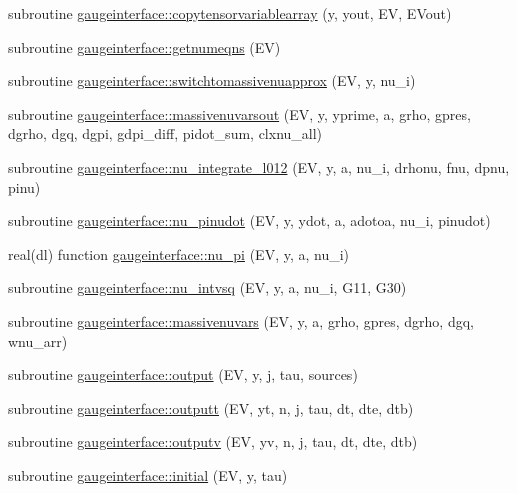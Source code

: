 \begin{DoxyCompactItemize}
\item 
subroutine \mbox{\hyperlink{namespacegaugeinterface_ab306d2378bd6f559471a11afc145621c}{gaugeinterface\+::copytensorvariablearray}} (y, yout, EV, E\+Vout)
\item 
subroutine \mbox{\hyperlink{namespacegaugeinterface_ad273d68dadb4d4fcc10422fed213ca25}{gaugeinterface\+::getnumeqns}} (EV)
\item 
subroutine \mbox{\hyperlink{namespacegaugeinterface_ac7f67b6e2bc871b4eb1a6d3453f796a3}{gaugeinterface\+::switchtomassivenuapprox}} (EV, y, nu\+\_\+i)
\item 
subroutine \mbox{\hyperlink{namespacegaugeinterface_ac756539212eaeba8021159b26d1d2881}{gaugeinterface\+::massivenuvarsout}} (EV, y, yprime, a, grho, gpres, dgrho, dgq, dgpi, gdpi\+\_\+diff, pidot\+\_\+sum, clxnu\+\_\+all)
\item 
subroutine \mbox{\hyperlink{namespacegaugeinterface_aaf5da349a1adc87f4c62f51f1e0c0371}{gaugeinterface\+::nu\+\_\+integrate\+\_\+l012}} (EV, y, a, nu\+\_\+i, drhonu, fnu, dpnu, pinu)
\item 
subroutine \mbox{\hyperlink{namespacegaugeinterface_acba44d8f8f824999640418908be29b9b}{gaugeinterface\+::nu\+\_\+pinudot}} (EV, y, ydot, a, adotoa, nu\+\_\+i, pinudot)
\item 
real(dl) function \mbox{\hyperlink{namespacegaugeinterface_a33373e2888fd46e2c443d7e8c2785639}{gaugeinterface\+::nu\+\_\+pi}} (EV, y, a, nu\+\_\+i)
\item 
subroutine \mbox{\hyperlink{namespacegaugeinterface_a2e8822823d298cb0912b5ec22ea4a6ff}{gaugeinterface\+::nu\+\_\+intvsq}} (EV, y, a, nu\+\_\+i, G11, G30)
\item 
subroutine \mbox{\hyperlink{namespacegaugeinterface_ae4228ed9cfb9382025eb84617b0ed091}{gaugeinterface\+::massivenuvars}} (EV, y, a, grho, gpres, dgrho, dgq, wnu\+\_\+arr)
\item 
subroutine \mbox{\hyperlink{namespacegaugeinterface_ac370c67bc9750bf5749a69531fe3ffc1}{gaugeinterface\+::output}} (EV, y, j, tau, sources)
\item 
subroutine \mbox{\hyperlink{namespacegaugeinterface_a5235d59ec77fa4b3a41d9754c8e447ca}{gaugeinterface\+::outputt}} (EV, yt, n, j, tau, dt, dte, dtb)
\item 
subroutine \mbox{\hyperlink{namespacegaugeinterface_ad9126befa5df67da981345f6230fede4}{gaugeinterface\+::outputv}} (EV, yv, n, j, tau, dt, dte, dtb)
\item 
subroutine \mbox{\hyperlink{namespacegaugeinterface_aa05aaad2bec1907778ea8eae3a7ba521}{gaugeinterface\+::initial}} (EV, y, tau)

\end{DoxyCompactItemize}
